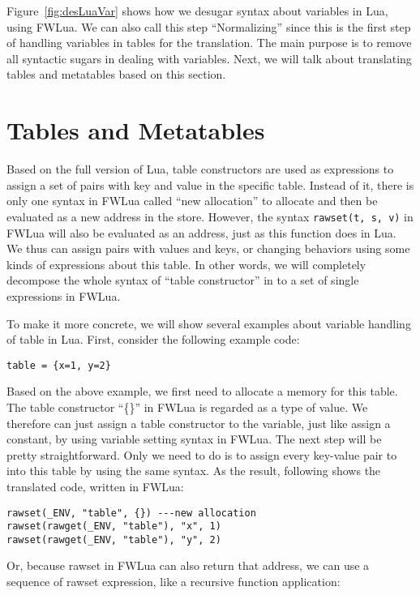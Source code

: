Figure~\ref{fig:desLuaVar} shows how we desugar syntax about variables in Lua, using FWLua. We can also call this step ``Normalizing'' since this is the first step of handling variables in tables for the translation. The main purpose is to remove all syntactic sugars in dealing with variables. Next, we will talk about translating tables and metatables based on this section.

\section{Tables and Metatables}\label{sec:TranslateTabls}
Based on the full version of Lua, table constructors are used as expressions to assign a set of pairs with key and value in the specific table. Instead of it, there is only one syntax in FWLua called ``new allocation'' to allocate and then be evaluated as a new address in the store. 
However, the syntax {\tt rawset(t, s, v)} in FWLua will also be evaluated as an address, just as this function does in Lua. We thus can assign pairs with values and keys, or changing behaviors using some kinds of expressions about this table. In other words, we will completely decompose the whole syntax of ``table constructor'' in to a set of single expressions in FWLua. 

To make it more concrete, we will show several examples about variable handling of table in Lua. First, consider the following example code:

\begin{verbatim}
table = {x=1, y=2}
\end{verbatim}

Based on the above example, we first need to allocate a memory for this table. The table constructor ``\{\}'' in FWLua is regarded as a type of value. We therefore can just assign a table constructor to the variable, just like assign a constant, by using variable setting syntax in FWLua. The next step will be pretty straightforward. Only we need to do is to assign every key-value pair to into this table by using the same syntax. As the result, following shows the translated code, written in FWLua:

\begin{verbatim}
rawset(_ENV, "table", {}) ---new allocation
rawset(rawget(_ENV, "table"), "x", 1)
rawset(rawget(_ENV, "table"), "y", 2)
\end{verbatim}

Or, because rawset in FWLua can also return that address, we can use a sequence of rawset expression, like a recursive function application:

